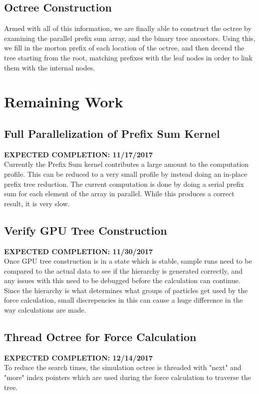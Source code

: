 \documentclass[fleqn,10pt]{SelfArx} %
\begin{document}
\subsection{Octree Construction}
Armed with all of this information, we are finally able to construct the octree by examining the parallel prefix sum array, and the binary tree ancestors. Using this, we fill in the morton prefix of each location of the octree, and then decend the tree starting from the root, matching prefixes with the leaf nodes in order to link them with the internal nodes.


\section{Remaining Work}

\subsection{Full Parallelization of Prefix Sum Kernel}
\textbf{EXPECTED COMPLETION: 11/17/2017}\\
Currently the Prefix Sum kernel contributes a large amount to the computation profile. This can be reduced to a very small profile by instead doing an in-place prefix tree reduction. The current computation is done by doing a serial prefix sum for each element of the array in parallel. While this produces a correct result, it is very slow.

\subsection{Verify GPU Tree Construction}
\textbf{EXPECTED COMPLETION: 11/30/2017}\\
Once GPU tree construction is in a state which is stable, sample runs need to be compared to the actual data to see if the hierarchy is generated correctly, and any issues with this need to be debugged before the calculation can continue. Since the hierarchy is what determines what groups of particles get used by the force calculation, small discrepencies in this can cause a huge difference in the way calculations are made.

\subsection{Thread Octree for Force Calculation}
\textbf{EXPECTED COMPLETION: 12/14/2017}\\
To reduce the search times, the simulation octree is threaded with "next" and "more" index pointers which are used during the force calculation to traverse the tree. 
\end{document}
